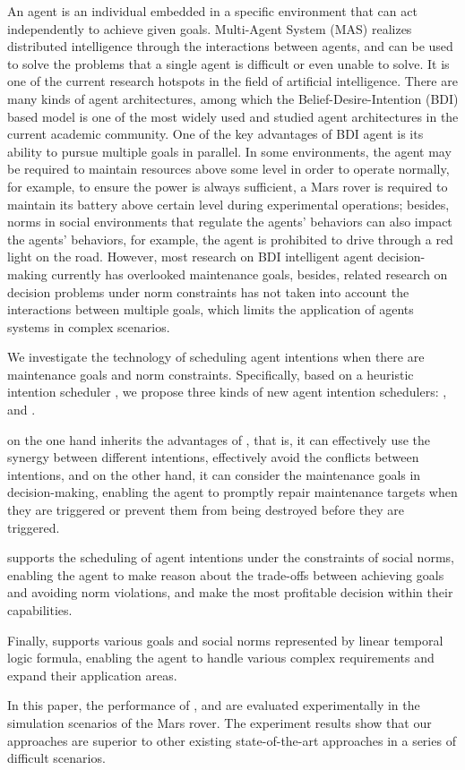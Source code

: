 \begin{abstract*}
    An agent is an individual embedded in a specific environment that can act independently to achieve given goals. Multi-Agent System (MAS) realizes distributed intelligence through the interactions between agents, and can be used to solve the problems that a single agent is difficult or even unable to solve.
    It is one of the current research hotspots in the field of artificial intelligence. 
    There are many kinds of agent architectures, among which the Belief-Desire-Intention (BDI) based model is one of the most widely used and studied agent architectures in the current academic community.
    One of the key advantages of BDI agent is its ability to pursue multiple goals in parallel. In some environments, the agent may be required to maintain resources above some level in order to operate normally, for example, to ensure the power is always sufficient, a Mars rover is required to maintain its battery above certain level during experimental operations; besides, norms in social environments that regulate the agents' behaviors can also impact the agents' behaviors, for example, the agent is prohibited to drive through a red light on the road. However, most research on BDI intelligent agent decision-making currently has overlooked maintenance goals, besides, related research on decision problems under norm constraints has not taken into account the interactions between multiple goals, which limits the application of agents systems in complex scenarios. 

    We investigate the technology of scheduling agent intentions when there are maintenance goals and norm constraints. 
    Specifically, based on a heuristic intention scheduler \SA, we propose three kinds of new agent intention schedulers: \SAM, \SAN and \SAT. 

   \SAM on the one hand inherits the advantages of \SA, that is, it can effectively use the synergy between different intentions, effectively avoid the conflicts between intentions, and on the other hand, it can consider the maintenance goals in decision-making, enabling the agent to promptly repair maintenance targets when they are triggered or prevent them from being destroyed before they are triggered.
   
   \SAN supports the scheduling of agent intentions under the constraints of social norms, enabling the agent to make reason about the trade-offs between achieving goals and avoiding norm violations, and make the most profitable decision within their capabilities.
   
   Finally, \SAT supports various goals and social norms represented by linear temporal logic formula, enabling the agent to handle various complex requirements and expand their application areas.

 

   In this paper, the performance of \SAM, \SAN and \SAT are evaluated experimentally in the simulation scenarios of the Mars rover. The experiment results show that our approaches are superior to other existing state-of-the-art approaches in a series of difficult scenarios.
\end{abstract*}
